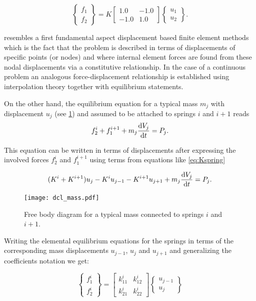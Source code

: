 \begin{equation}
    \begin{Bmatrix}
        f_1\\
        f_2
    \end{Bmatrix} =
    K\begin{bmatrix}
          1.0 & -1.0\\
        - 1.0 & 1.0
    \end{bmatrix}
    \begin{Bmatrix}
        u_1\\
        u_2
    \end{Bmatrix}.
    \label{eq:Kspring}
\end{equation}

 resembles a first fundamental aspect displacement based finite element methods which is the fact that the problem is described in terms of displacements of specific points (or nodes) and where internal element forces are found from these nodal displacements via a constitutive relationship. In the case of a continuous problem an analogous force-displacement relationship is established using interpolation theory together with equilibrium statements.


On the other hand, the equilibrium equation for a typical mass $m_j$ with displacement $u_j$  (see \cref{fig:dclmass}) and assumed to be attached to springs $i$ and $i+1$ reads
\begin{equation}
f_2^i + f_1^{i + 1} + m_j \dv{V_j}{t} = P_j.
\label{eq:equilmass}
\end{equation}

This equation can be written in terms of displacements after expressing the involved forces $f_2^i$ and $f_1^{i + 1}$ using terms from equations like \ref{eq:Kspring}

\[(K^i + K^{i + 1}) u_j - K^i u_{j - 1} - K^{i + 1} u_{j + 1} + m_j\dv{V_j}{t} = P_j .\]


\begin{figure}[H]
\centering
\texttt{[image: dcl\_mass.pdf]}
\caption{Free body diagram for a typical mass connected to springs $i$ and $i+1$.}
\label{fig:dclmass}
\end{figure}


Writing the elemental equilibrium equations for the springs in terms of the corresponding mass displacements $u_{j - 1}$, $u_j$ and $u_{j + 1}$ and generalizing the coefficients notation we get:

\[\left\{ {\begin{array}{*{20}{c}}
{f_1^i}\\
{f_2^i}
\end{array}} \right\} = \left[ {\begin{array}{*{20}{c}}
{k_{11}^i}&{k_{12}^i}\\
{k_{21}^i}&{k_{22}^i}
\end{array}} \right]\left\{ {\begin{array}{*{20}{c}}
{{u_{j - 1}}}\\
{{u_j}}
\end{array}} \right\}\]

